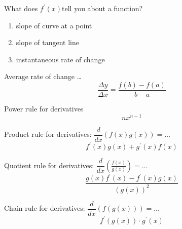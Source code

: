 \documentclass[avery5371,grid]{flashcards}
\begin{document}
\begin{flashcard}[Definition]{What does $f^{\prime}(x)$tell you about a function?}
    \begin{enumerate}
        \item slope of curve at a point
        \item slope of tangent line
        \item instantaneous rate of change
    \end{enumerate}
\end{flashcard}

\begin{flashcard}[Definition]{Average rate of change \ldots}
    \begin{equation}
        \frac{\Delta y}{\Delta x} = \frac{ f(b) - f(a) }{b-a}
    \end{equation}
\end{flashcard}

\begin{flashcard}[Definition]{Power rule for derivatives}
    \begin{equation}
        n x^{n-1}
    \end{equation}
\end{flashcard}

\begin{flashcard}[Definition]{Product rule for derivatives:
    $\dfrac{d}{dx}\left( f(x) g(x) \right) = \ldots$}
    \begin{equation}
        f^{\prime}(x) g(x) + g^{\prime}(x) f(x)
    \end{equation}
\end{flashcard}

\begin{flashcard}[Definition]{Quotient rule for derivatives:
    $\dfrac{d}{dx}\left( \frac{f(x)}{g(x)} \right) = \ldots$}
    \begin{equation}
        \frac{ g(x)f^{\prime}(x) - f^{\prime}(x) g(x) }{ \left(g(x)\right)^2 }
    \end{equation}
\end{flashcard}

\begin{flashcard}[Definition]{Chain rule for derivatives:
    $\dfrac{d}{dx}\left( f\left( g\left(x\right) \right) \right) = \ldots$}
    \begin{equation}
        f^{\prime}\left( g(x) \right)\cdot g^{\prime}(x)
    \end{equation}
\end{flashcard}
\end{document}
